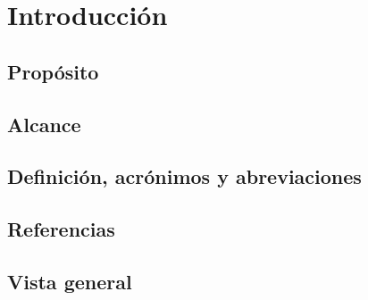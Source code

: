 \chapter{Introducción}
\section{Propósito}
\section{Alcance}
\section{Definición, acrónimos y abreviaciones}
\section{Referencias}
\section{Vista general}